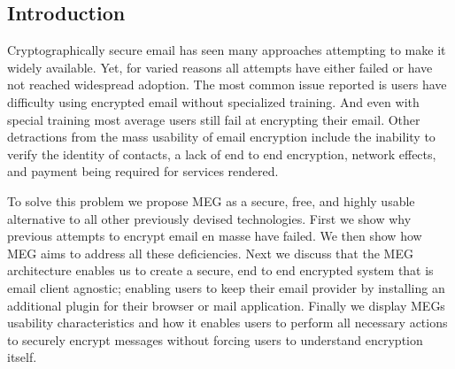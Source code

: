 \documentclass[10pt]{article}
\begin{document}
\begin{multicols}{2}
\section{Introduction}
\par Cryptographically secure email has seen many approaches attempting to make it widely available. Yet, for varied reasons all attempts have either failed or have not reached widespread adoption. The most common issue reported is users have difficulty using encrypted email without specialized training. And even with special training most average users still fail at encrypting their email\cite{whitten1999johnny}. Other detractions from the mass usability of email encryption include the inability to verify the identity of contacts, a lack of end to end encryption, network effects, and payment being required for services rendered.
\par To solve this problem we propose MEG as a secure, free, and highly usable alternative to all other previously devised technologies. First we show why previous attempts to encrypt email en masse have failed. We then show how MEG aims to address all these deficiencies. Next we discuss that the MEG architecture enables us to create a secure, end to end encrypted system that is email client agnostic; enabling users to keep their email provider by installing an additional plugin for their browser or mail application. Finally we display MEGs usability characteristics and how it enables users to perform all necessary actions to securely encrypt messages without forcing users to understand encryption itself.

\end{multicols}
\end{document}
